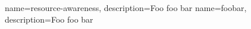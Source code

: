 {
    name={resource-awareness},
    description={Foo foo bar}
}
{
    name={foobar},
    description={Foo foo bar}
}

